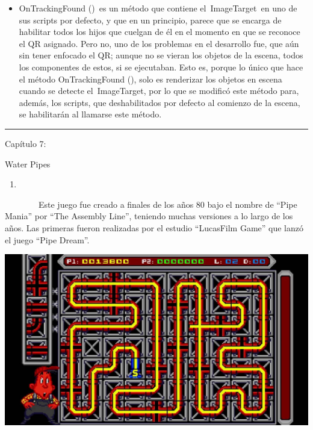 \documentclass[]{article}
\begin{document}
\begin{itemize}
\itemsep1pt\parskip0pt
\item
  OnTrackingFound ()~es un método que contiene el~ImageTarget~en uno de
  sus scripts por defecto, y que en un principio, parece que se encarga
  de habilitar todos los hijos que cuelgan de él en el momento en que se
  reconoce el QR asignado. Pero no, uno de los problemas en el
  desarrollo fue, que aún sin tener enfocado el QR; aunque no se vieran
  los objetos de la escena, todos los componentes de estos, si se
  ejecutaban. Esto es, porque lo único que hace el método
  OnTrackingFound (), solo es renderizar los objetos en escena cuando se
  detecte el~ImageTarget, por lo que se modificó este método para,
  además, los scripts, que deshabilitados por defecto al comienzo de la
  escena, se habilitarán al llamarse este método.
\end{itemize}

\begin{center}\rule{3in}{0.4pt}\end{center}

Capítulo 7:

Water Pipes

\begin{enumerate}
\item
\end{enumerate}

~~~~~~~~Este juego fue creado a finales de los años 80 bajo el nombre de
``Pipe Mania'' por ``The Assembly Line'', teniendo muchas versiones a lo
largo de los años. Las primeras fueron realizadas por el estudio
``LucasFilm Game'' que lanzó el juego ``Pipe Dream''.

\includegraphics{images/image18.jpg}
\end{document}

